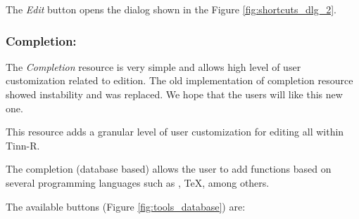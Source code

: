The \textit{Edit} button opens the dialog shown in the Figure \ref{fig:shortcuts_dlg_2}.

\subsubsection{Completion:}

The \textit{Completion} resource is very simple and allows high level
of user customization related to edition. The old implementation of
completion resource showed instability and was replaced. We hope that
the users will like this new one.

This resource adds a granular level of user customization for editing
all within Tinn-R.

The completion (database based) allows the user to add functions based
on several programming languages such as \RR{}, \TeX, among others.

The available buttons
(Figure \ref{fig:tools_database})
are:

